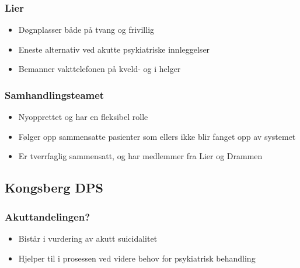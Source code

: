 \documentclass[11pt]{report} %
\begin{document}
                        \subsubsection{Lier}\label{sec:org_ddps_lier}
                          \begin{itemize}
                            \item Døgnplasser både på tvang og frivillig\\
                            \item Eneste alternativ ved akutte psykiatriske innleggelser\\
                            \item Bemanner vakttelefonen på kveld- og i helger\\
                          \end{itemize}  
                        \subsubsection{Samhandlingsteamet}\label{sec:org_ddps_samh}
                          \begin{itemize}
                            \item Nyopprettet og har en fleksibel rolle\\
                            \item Følger opp sammensatte pasienter som ellers ikke blir fanget opp av systemet\\
                            \item Er tverrfaglig sammensatt, og har medlemmer fra Lier og Drammen\\
                          \end{itemize}  
                        
                  \subsection{Kongsberg DPS}\label{sec:org_kdps}
                      \subsubsection{Akuttandelingen?}\label{sec:org_kdps_akutt}
                          \begin{itemize}
                            \item Bistår i vurdering av akutt suicidalitet\\
                            \item Hjelper til i prosessen ved videre behov for psykiatrisk behandling\\
                          \end{itemize} 
\end{document}
